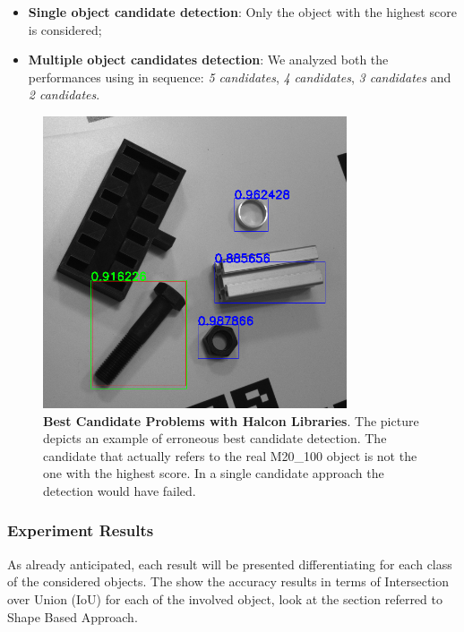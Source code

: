 \begin{itemize}
	\item \textbf{Single object candidate detection}: Only the object with the highest score is considered;
	\item \textbf{Multiple object candidates detection}: We analyzed both the performances using in sequence: \emph{5 candidates}, \emph{4 candidates}, \emph{3 candidates} and \emph{2 candidates}.
\end{itemize}

\begin{figure}
    \centering
    \includegraphics[width=0.8\textwidth]{figures/4_experiments/m20_100_halcon_detection_problems}
    \caption{\textbf{Best Candidate Problems with Halcon Libraries}. The picture depicts an example of erroneous best candidate detection. The candidate that actually refers to the real M20\_100 object is not the one with the highest score. In a single candidate approach the detection would have failed.}
    \label{fig:m20_100_halcon_detection_problems}
\end{figure}

\subsubsection{Experiment Results}
As already anticipated, each result will be presented differentiating for each class of the considered objects. The  show the accuracy results in terms of Intersection over Union (IoU) for each of the involved object, look at the section referred to Shape Based Approach.

